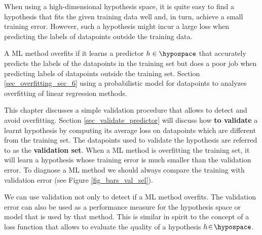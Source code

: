 \documentclass[12pt]{report}
\begin{document}
When using a high-dimensional hypothesis space, it is quite easy to find a 
hypothesis that fits the given training data well and, in turn, achieve a small 
training error. However, such a hypothesis might incur a large loss when 
predicting the labels of datapoints outside the training data. 

A ML method overfits if it learns a predictor $h \in \hypospace$ that 
accurately predicts the labels of the datapoints in the training set 
but does a poor job when predicting labels of datapoints outside 
the training set. Section \ref{sec_overfitting_sec_6} using a probabilistic 
model for datapoints to analyzes overfitting of linear regression methods. 

This chapter discusses a simple validation procedure that allows to 
detect and avoid overfitting. Section \ref{sec_validate_predictor} will 
discuss how {\bf to validate} a learnt hypothesis by computing its 
average loss on datapoints which are different from the training set. 
The datapoints used to validate the hypothesis are referred to as the 
{\bf validation set}. When a ML method is overfitting the training set, 
it will learn a hypothesis whose training error is much smaller than 
the validation error. To diagnose a ML method we should always 
compare the training with validation error (see Figure \ref{fig_bars_val_sel}). 

%
%

We can use validation not only to detect if a ML method overfits. 
The validation error can also be used as a performance measure 
for the hypothesis space or model that is used by that method. 
This is similar in spirit to the concept of a loss function that 
allows to evaluate the quality of a hypothesis $h\!\in\!\hypospace$. 
\end{document}
